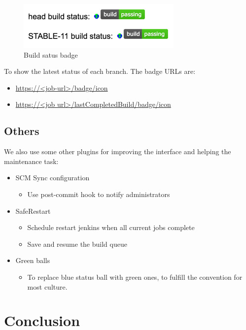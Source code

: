 \documentclass[a4paper,twocolumn,10pt]{article}
\begin{document}
\begin{figure}
\includegraphics{build-status-badge.png}
\caption{Build satus badge}
\label{build-status-badge}
\end{figure}

To show the latest status of each branch. The badge URLs are:
\begin{itemize}
\item \url{https://<job-url>/badge/icon}
\item \url{https://<job url>/lastCompletedBuild/badge/icon}
\end{itemize}

\subsection{Others}

We also use some other plugins for improving the interface and helping the
maintenance task:

\begin{itemize}
\item SCM Sync configuration
  \begin{itemize}
  \item Use post-commit hook to notify administrators
  \end{itemize}
\item SafeRestart
  \begin{itemize}
  \item Schedule restart jenkins when all current jobs complete
  \item Save and resume the build queue
  \end{itemize}
\item Green balls
  \begin{itemize}
  \item To replace blue status ball with green ones, to fulfill the convention
        for most culture.
  \end{itemize}
\end{itemize}

\section{Conclusion}
\end{document}
